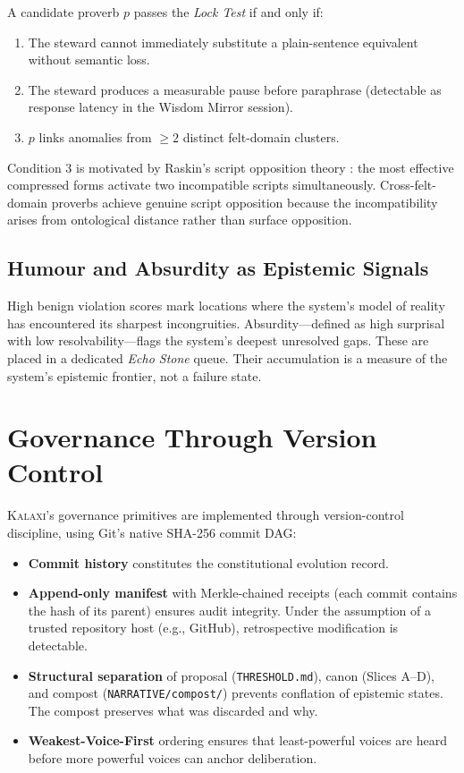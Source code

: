 \documentclass[12pt,a4paper]{article}
\theoremstyle{definition}
\theoremstyle{remark}
\newcommand{\kalaxi}{\textsc{Kalaxi}}
\begin{document}
A candidate proverb $p$ passes the \emph{Lock Test} if and only if:

\begin{enumerate}
\item The steward cannot immediately substitute a plain-sentence equivalent without
  semantic loss.
\item The steward produces a measurable pause before paraphrase (detectable as
  response latency in the Wisdom Mirror session).
\item $p$ links anomalies from $\geq 2$ distinct felt-domain clusters.
\end{enumerate}

Condition 3 is motivated by Raskin's script opposition theory \cite{raskin1985}: the
most effective compressed forms activate two incompatible scripts simultaneously.
Cross-felt-domain proverbs achieve genuine script opposition because the incompatibility
arises from ontological distance rather than surface opposition.

\subsection{Humour and Absurdity as Epistemic Signals}

High benign violation scores mark locations where the system's model of reality has
encountered its sharpest incongruities. Absurdity—defined as high surprisal with low
resolvability—flags the system's deepest unresolved gaps. These are placed in a
dedicated \emph{Echo Stone} queue. Their accumulation is a measure of the system's
epistemic frontier, not a failure state.

\section{Governance Through Version Control}
\label{sec:vc}

\kalaxi{}'s governance primitives are implemented through version-control discipline,
using Git's native SHA-256 commit DAG:

\begin{itemize}
\item \textbf{Commit history} constitutes the constitutional evolution record.
\item \textbf{Append-only manifest} with Merkle-chained receipts (each commit contains
  the hash of its parent) ensures audit integrity. Under the assumption of a trusted
  repository host (e.g., GitHub), retrospective modification is detectable.
\item \textbf{Structural separation} of proposal (\texttt{THRESHOLD.md}), canon
  (Slices A--D), and compost (\texttt{NARRATIVE/compost/}) prevents conflation of
  epistemic states. The compost preserves what was discarded and why.
\item \textbf{Weakest-Voice-First} ordering ensures that least-powerful voices are
  heard before more powerful voices can anchor deliberation.
\end{itemize}
\end{document}
